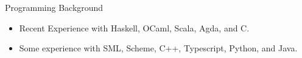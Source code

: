 \documentclass{resume} %
\begin{document}
\begin{rSection}{Programming Background}
\begin{itemize}
    \item Recent Experience with Haskell, OCaml, Scala, Agda, and C.
    \item Some experience with SML, Scheme, C++, Typescript, Python, and Java.
\end{itemize}
\end{rSection}


\end{document}
